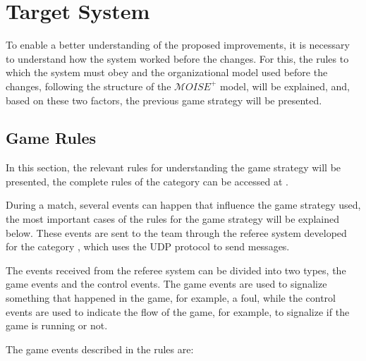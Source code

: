 \chapter{Target System}
\label{ch:target_system}

\def \MOISEp {$\mathcal{M}OISE^+$}

To enable a better understanding of the proposed improvements, it is necessary to understand how the system worked before the changes. For this, the rules to which the system must obey and the organizational model used before the changes, following the structure of the \MOISEp \cite{MOISEp} model, will be explained, and, based on these two factors, the previous game strategy will be presented.

\section{Game Rules}
\label{sec:rules}

In this section, the relevant rules for understanding the game strategy will be presented, the complete rules of the category can be accessed at \cite{RulesVSSS}.

During a match, several events can happen that influence the game strategy used, the most important cases of the rules for the game strategy will be explained below. These events are sent to the team through the referee system developed for the category \cite{VSSReferee}, which uses the UDP protocol to send messages.

The events received from the referee system can be divided into two types, the game events and the control events. The game events are used to signalize something that happened in the game, for example, a foul, while the control events are used to indicate the flow of the game, for example, to signalize if the game is running or not.

The game events described in the rules are:


